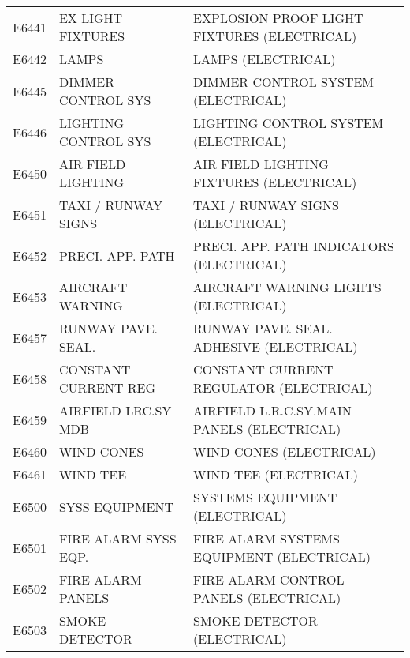 \begin{longtable}[l]{l%
                  l|%
                  l|}
\rowcolor{thetableheadbgcolor!0.25!white} E6441       & EX LIGHT FIXTURES   & EXPLOSION PROOF LIGHT FIXTURES (ELECTRICAL)   \\
\rowcolor{thetableheadbgcolor!0.25!white} E6442       & LAMPS   & LAMPS (ELECTRICAL)   \\
\rowcolor{thetableheadbgcolor!0.25!white} E6445       & DIMMER CONTROL SYS   & DIMMER CONTROL SYSTEM (ELECTRICAL)   \\
\rowcolor{thetableheadbgcolor!0.25!white} E6446       & LIGHTING CONTROL SYS   & LIGHTING CONTROL SYSTEM (ELECTRICAL)   \\
\rowcolor{thetableheadbgcolor!0.25!white} E6450       & AIR FIELD LIGHTING   & AIR FIELD LIGHTING FIXTURES (ELECTRICAL)   \\
\rowcolor{thetableheadbgcolor!0.25!white} E6451       & TAXI / RUNWAY SIGNS   & TAXI / RUNWAY SIGNS (ELECTRICAL)   \\
\rowcolor{thetableheadbgcolor!0.25!white} E6452       & PRECI. APP. PATH   & PRECI. APP. PATH INDICATORS (ELECTRICAL)   \\
\rowcolor{thetableheadbgcolor!0.25!white} E6453       & AIRCRAFT WARNING   & AIRCRAFT WARNING LIGHTS (ELECTRICAL)   \\
\rowcolor{thetableheadbgcolor!0.25!white} E6457       & RUNWAY PAVE. SEAL.   & RUNWAY PAVE. SEAL. ADHESIVE (ELECTRICAL)   \\
\rowcolor{thetableheadbgcolor!0.25!white} E6458       & CONSTANT CURRENT REG   & CONSTANT CURRENT REGULATOR (ELECTRICAL)   \\
\rowcolor{thetableheadbgcolor!0.25!white} E6459       & AIRFIELD LRC.SY MDB   & AIRFIELD L.R.C.SY.MAIN PANELS (ELECTRICAL)   \\
\rowcolor{thetableheadbgcolor!0.25!white} E6460       & WIND CONES   & WIND CONES (ELECTRICAL)   \\
\rowcolor{thetableheadbgcolor!0.25!white} E6461       & WIND TEE   & WIND TEE (ELECTRICAL)   \\
\rowcolor{thetableheadbgcolor!0.25!white} E6500       & SYSS EQUIPMENT   & SYSTEMS EQUIPMENT (ELECTRICAL)   \\
\rowcolor{thetableheadbgcolor!0.25!white} E6501       & FIRE ALARM SYSS EQP.   & FIRE ALARM SYSTEMS EQUIPMENT (ELECTRICAL)   \\
\rowcolor{thetableheadbgcolor!0.25!white} E6502       & FIRE ALARM PANELS   & FIRE ALARM CONTROL PANELS (ELECTRICAL)   \\
\rowcolor{thetableheadbgcolor!0.25!white} E6503       & SMOKE DETECTOR   & SMOKE DETECTOR (ELECTRICAL)   \\

\end{longtable}
